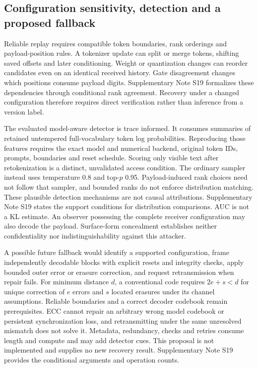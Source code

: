 \documentclass[fleqn,10pt]{wlscirep}
\begin{document}


\subsection*{Configuration sensitivity, detection and a proposed fallback}\label{sec:v4-boundaries}
Reliable replay requires compatible token boundaries, rank orderings and payload-position rules. A tokenizer update can split or merge tokens, shifting saved offsets and later conditioning. Weight or quantization changes can reorder candidates even on an identical received history. Gate disagreement changes which positions consume payload digits. Supplementary Note S19 formalizes these dependencies through conditional rank agreement. Recovery under a changed configuration therefore requires direct verification rather than inference from a version label.

The evaluated model-aware detector is trace informed. It consumes summaries of retained untempered full-vocabulary token log probabilities. Reproducing those features requires the exact model and numerical backend, original token IDs, prompts, boundaries and reset schedule. Scoring only visible text after retokenization is a distinct, unvalidated access condition. The ordinary sampler instead uses temperature 0.8 and top-\(p\) 0.95. Payload-induced rank choices need not follow that sampler, and bounded ranks do not enforce distribution matching. These plausible detection mechanisms are not causal attributions. Supplementary Note S19 states the support conditions for distribution comparisons. AUC is not a KL estimate. An observer possessing the complete receiver configuration may also decode the payload. Surface-form concealment establishes neither confidentiality nor indistinguishability against this attacker.

A possible future fallback would identify a supported configuration, frame independently decodable blocks with explicit resets and integrity checks, apply bounded outer error or erasure correction, and request retransmission when repair fails. For minimum distance \(d\), a conventional code requires \(2e+s<d\) for unique correction of \(e\) errors and \(s\) located erasures under its channel assumptions. Reliable boundaries and a correct decoder codebook remain prerequisites. ECC cannot repair an arbitrary wrong model codebook or persistent synchronization loss, and retransmitting under the same unresolved mismatch does not solve it. Metadata, redundancy, checks and retries consume length and compute and may add detector cues. This proposal is not implemented and supplies no new recovery result. Supplementary Note S19 provides the conditional arguments and operation counts.
\end{document}
